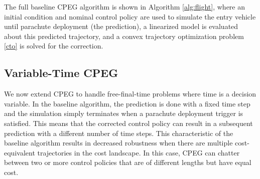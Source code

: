 The full baseline CPEG algorithm is shown in Algorithm \ref{alg:flight}, where an initial condition and nominal control policy are used to simulate the entry vehicle until parachute deployment (the prediction), a linearized model is evaluated about this predicted trajectory, and a convex trajectory optimization problem \eqref{cto} is solved for the correction. 
\subsection{Variable-Time CPEG}
 We now extend CPEG to handle free-final-time problems where time is a decision variable. In the baseline algorithm, the prediction is done with a fixed time step and the simulation simply terminates when a parachute deployment trigger is satisfied. This means that the corrected control policy can result in a subsequent prediction with a different number of time steps. This characteristic of the baseline algorithm results in decreased robustness when there are multiple cost-equivalent trajectories in the cost landscape. In this case, CPEG can chatter between two or more control policies that are of different lengths but have equal cost. 

